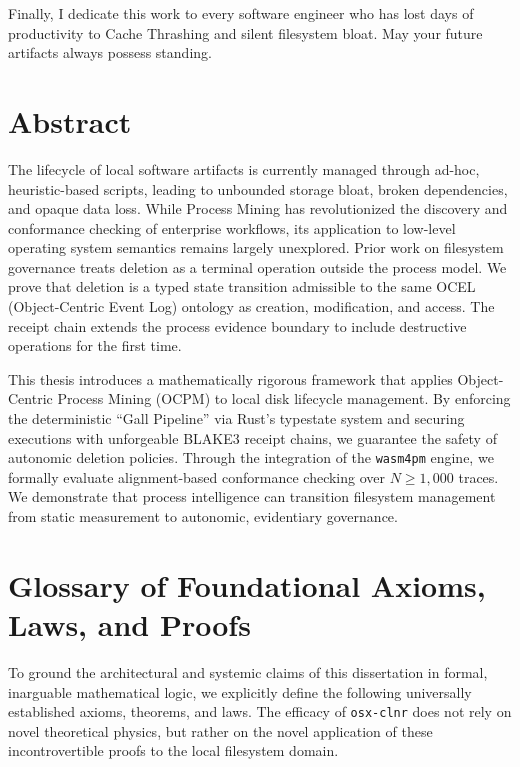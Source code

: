 \documentclass[
  12pt,
]{report}
\begin{document}
Finally, I dedicate this work to every software engineer who has lost
days of productivity to Cache Thrashing and silent filesystem bloat. May
your future artifacts always possess standing.

\newpage

\chapter{Abstract}\label{abstract}

The lifecycle of local software artifacts is currently managed through
ad-hoc, heuristic-based scripts, leading to unbounded storage bloat,
broken dependencies, and opaque data loss. While Process Mining has
revolutionized the discovery and conformance checking of enterprise
workflows, its application to low-level operating system semantics
remains largely unexplored. Prior work on filesystem governance treats
deletion as a terminal operation outside the process model. We prove
that deletion is a typed state transition admissible to the same OCEL
(Object-Centric Event Log) ontology as creation, modification, and
access. The receipt chain extends the process evidence boundary to
include destructive operations for the first time.

This thesis introduces a mathematically rigorous framework that applies
Object-Centric Process Mining (OCPM) to local disk lifecycle management.
By enforcing the deterministic ``Gall Pipeline'' via Rust's typestate
system and securing executions with unforgeable BLAKE3 receipt chains,
we guarantee the safety of autonomic deletion policies. Through the
integration of the \texttt{wasm4pm} engine, we formally evaluate
alignment-based conformance checking over \(N \ge 1,000\) traces. We
demonstrate that process intelligence can transition filesystem
management from static measurement to autonomic, evidentiary governance.

\newpage

\chapter{Glossary of Foundational Axioms, Laws, and
Proofs}\label{glossary-of-foundational-axioms-laws-and-proofs}

To ground the architectural and systemic claims of this dissertation in
formal, inarguable mathematical logic, we explicitly define the
following universally established axioms, theorems, and laws. The
efficacy of \texttt{osx-clnr} does not rely on novel theoretical
physics, but rather on the novel application of these incontrovertible
proofs to the local filesystem domain.
\end{document}
